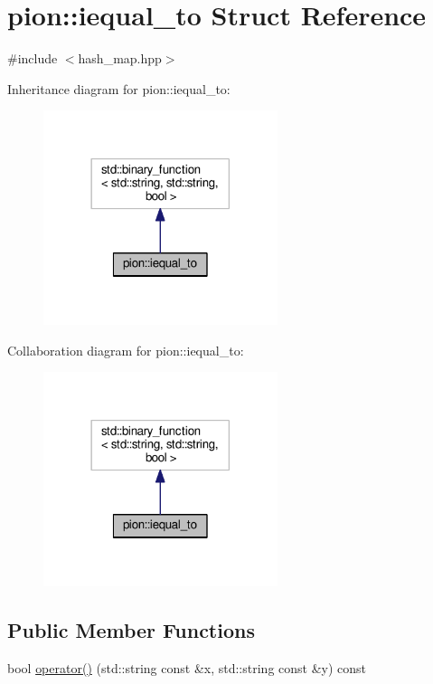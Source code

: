 \hypertarget{structpion_1_1iequal__to}{\section{pion\-:\-:iequal\-\_\-to Struct Reference}
\label{structpion_1_1iequal__to}
}


{\ttfamily \#include $<$hash\-\_\-map.\-hpp$>$}



Inheritance diagram for pion\-:\-:iequal\-\_\-to\-:
\nopagebreak
\begin{figure}[H]
\begin{center}
\leavevmode
\includegraphics[width=194pt]{structpion_1_1iequal__to__inherit__graph}
\end{center}
\end{figure}


Collaboration diagram for pion\-:\-:iequal\-\_\-to\-:
\nopagebreak
\begin{figure}[H]
\begin{center}
\leavevmode
\includegraphics[width=194pt]{structpion_1_1iequal__to__coll__graph}
\end{center}
\end{figure}
\subsection*{Public Member Functions}
\begin{DoxyCompactItemize}
\item 
bool \hyperlink{structpion_1_1iequal__to_abdbf26bf08c7d62d25d76968558b4818}{operator()} (std\-::string const \&x, std\-::string const \&y) const 
\end{DoxyCompactItemize}



